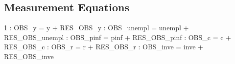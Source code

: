 \documentclass{article}%
\begin{document}
%
\subsection{Measurement Equations}%
\label{subsec:MeasurementEquations}%
 1    :  OBS\_y = y + RES\_OBS\_y\newline%
    :  OBS\_unempl = unempl + RES\_OBS\_unempl\newline%
    :  OBS\_pinf = pinf + RES\_OBS\_pinf\newline%
    :  OBS\_c = c + RES\_OBS\_c\newline%
    :  OBS\_r = r + RES\_OBS\_r\newline%
    :  OBS\_inve = inve + RES\_OBS\_inve\newline%

%
\end{document}
